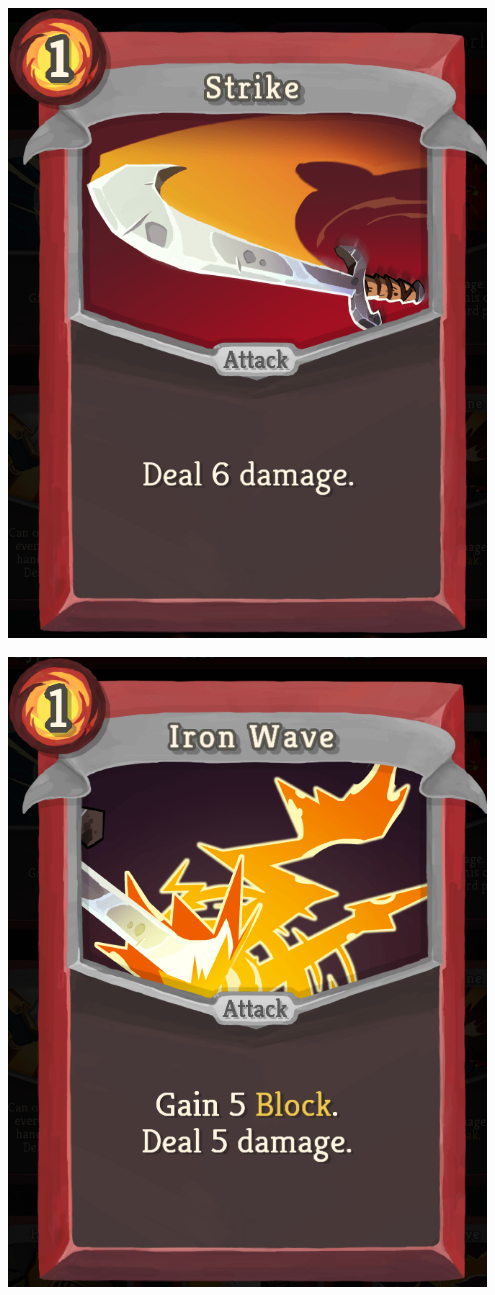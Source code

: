 \begin{center}
\begin{minipage}{.25\textwidth}
        \includegraphics[width=0.95\textwidth]{img/Slay-the-Spire-Strike.png}
    \end{minipage}%
    \begin{minipage}{.25\textwidth}
        \centering
        \includegraphics[width=0.95\textwidth]{img/Slay-the-Spire-Iron-Wave.png}

\end{minipage}
\end{center}
